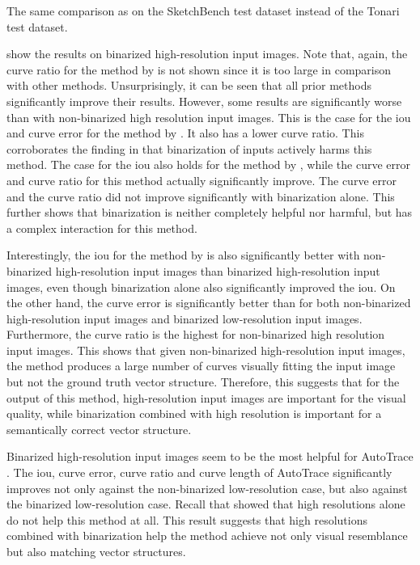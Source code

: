 \begin{table}[h]
    \centering
    
    \caption{The same comparison as  on the SketchBench test dataset instead of the Tonari test dataset.}
    \label{tab:sketchbench-True-1024-1.024}
\end{table}

 show the results on binarized high-resolution input images. Note that, again, the curve ratio for the method by \citet{Puhachov2021KeypointPolyvector} is not shown since it is too large in comparison with other methods. Unsurprisingly, it can be seen that all prior methods significantly improve their results. However, some results are significantly worse than with non-binarized high resolution input images. This is the case for the \gls{iou} and curve error for the method by \citet{DBLP:conf/eccv/EgiazarianVAVST20}. It also has a lower curve ratio. This corroborates the finding in  that binarization of inputs actively harms this method. The case for the \gls{iou} also holds for the method by \citet{mo2021virtualsketching}, while the curve error and curve ratio for this method actually significantly improve. The curve error and the curve ratio did not improve significantly with binarization alone. This further shows that binarization is neither completely helpful nor harmful, but has a complex interaction for this method.

Interestingly, the \gls{iou} for the method by \citet{Puhachov2021KeypointPolyvector} is also significantly better with non-binarized high-resolution input images than binarized high-resolution input images, even though binarization alone also significantly improved the \gls{iou}. On the other hand, the curve error is significantly better than for both non-binarized high-resolution input images and binarized low-resolution input images. Furthermore, the curve ratio is the highest for non-binarized high resolution input images. This shows that given non-binarized high-resolution input images, the method produces a large number of curves visually fitting the input image but not the ground truth vector structure. Therefore, this suggests that for the output of this method, high-resolution input images are important for the visual quality, while binarization combined with high resolution is important for a semantically correct vector structure.

Binarized high-resolution input images seem to be the most helpful for AutoTrace \citep{autotrace}. The \gls{iou}, curve error, curve ratio and curve length of AutoTrace \citep{autotrace} significantly improves not only against the non-binarized low-resolution case, but also against the binarized low-resolution case. Recall that  showed that high resolutions alone do not help this method at all. This result suggests that high resolutions combined with binarization help the method achieve not only visual resemblance but also matching vector structures.

